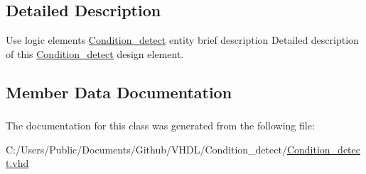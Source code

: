 \subsection{Detailed Description}
Use logic elements \hyperlink{class_condition__detect}{Condition\+\_\+detect} entity brief description Detailed description of this \hyperlink{class_condition__detect}{Condition\+\_\+detect} design element. 

\subsection{Member Data Documentation}
\subsubsection[{\texorpdfstring{I\+E\+EE}{IEEE}}]{\hspace{0.3cm}{\ttfamily [Library]}}\hypertarget{class_condition__detect_ae4f03c286607f3181e16b9aa12d0c6d4}{}\label{class_condition__detect_ae4f03c286607f3181e16b9aa12d0c6d4}
 

The documentation for this class was generated from the following file\+:\begin{DoxyCompactItemize}
\item 
C\+:/\+Users/\+Public/\+Documents/\+Github/\+V\+H\+D\+L/\+Condition\+\_\+detect/\hyperlink{_condition__detect_8vhd}{Condition\+\_\+detect.\+vhd}\end{DoxyCompactItemize}
